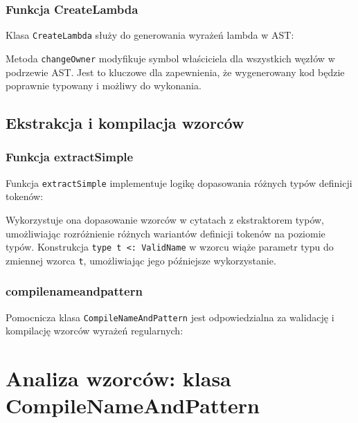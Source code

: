 \subsubsection{Funkcja CreateLambda}\label{subsubsec:funkcja-createlambda}

Klasa \texttt{CreateLambda} służy do generowania wyrażeń lambda w AST:



Metoda \texttt{changeOwner} modyfikuje symbol właściciela dla wszystkich węzłów w podrzewie AST. Jest to kluczowe dla zapewnienia, że wygenerowany kod będzie poprawnie typowany i możliwy do wykonania.

\subsection{Ekstrakcja i kompilacja wzorców}\label{subsec:ekstrakcja-i-kompilacja-wzorcow}

\subsubsection{Funkcja extractSimple}\label{subsubsec:funkcja-extractsimple}

Funkcja \texttt{extractSimple} implementuje logikę dopasowania różnych typów definicji tokenów:



Wykorzystuje ona dopasowanie wzorców w cytatach z ekstraktorem typów, umożliwiając rozróżnienie różnych wariantów definicji tokenów na poziomie typów.
Konstrukcja \texttt{type t <: ValidName} w wzorcu wiąże parametr typu do zmiennej wzorca \texttt{t}, umożliwiając jego późniejsze wykorzystanie.

\subsubsection{compilenameandpattern}\label{subsubsec:compilenameandpattern}

Pomocnicza klasa \texttt{CompileNameAndPattern} jest odpowiedzialna za walidację i kompilację wzorców wyrażeń regularnych:


\section{Analiza wzorców: klasa CompileNameAndPattern}
\label{sec:compile-name-pattern}

